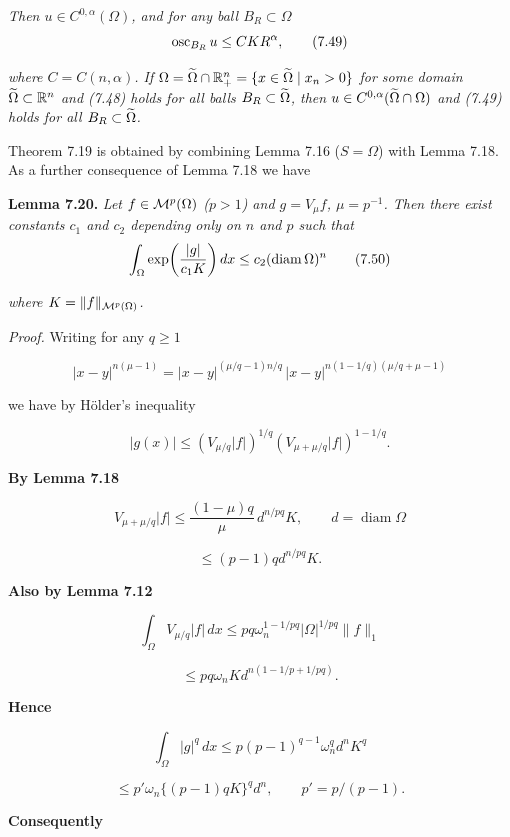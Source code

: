 \emph{Then $u \in C^{0,\alpha}(\Omega)$, and for any ball $B_R \subset \Omega$}
\begin{equation}
\operatorname{osc}_{B_R} u \le CKR^{\alpha},
\tag{7.49}
\end{equation}

\emph{where $C=C(n,\alpha)$. If $\Omega=\widetilde{\Omega} \cap \mathbb{R}^n_{+}=\{x\in \widetilde{\Omega} \mid x_n>0\}$ for some domain
$\widetilde{\Omega} \subset \mathbb{R}^n$ and (7.48) holds for all balls $B_R \subset \widetilde{\Omega}$, then $u \in C^{0,\alpha}(\widetilde{\Omega}\cap \Omega)$ and (7.49) holds for all
$B_R \subset \widetilde{\Omega}$.}

Theorem 7.19 is obtained by combining Lemma 7.16 ($S=\Omega$) with Lemma 7.18.
As a further consequence of Lemma 7.18 we have

\textbf{Lemma 7.20.} \emph{Let $f \in \mathcal{M}^p(\Omega)$ ($p>1$) and $g=V_{\mu}f$, $\mu=p^{-1}$. Then there exist constants $c_1$ and $c_2$ depending only on $n$ and $p$ such that}
\begin{equation}
\int_{\Omega} \exp\!\left(\frac{|g|}{c_1 K}\right) dx \le c_2 (\operatorname{diam} \Omega)^n
\tag{7.50}
\end{equation}

\emph{where $K=\|f\|_{\mathcal{M}^p(\Omega)}$.}


\emph{Proof.} Writing for any $q \geq 1$

\[
|x-y|^{n(\mu-1)} = |x-y|^{(\mu/q-1)n/q}\,|x-y|^{n(1-1/q)(\mu/q+\mu-1)}
\]

we have by H\"older's inequality

\[
|g(x)| \leq (V_{\mu/q}|f|)^{1/q}(V_{\mu+\mu/q}|f|)^{1-1/q}.
\]

\textbf{By Lemma 7.18}

\[
V_{\mu+\mu/q}|f| \leq \frac{(1-\mu)q}{\mu}\,d^{n/pq}K,\qquad d=\operatorname{diam}\Omega
\]

\[
\leq (p-1)q d^{n/pq}K.
\]

\textbf{Also by Lemma 7.12}

\[
\int_{\Omega} V_{\mu/q}|f|\,dx \leq pq\omega_n^{1-1/pq}|\Omega|^{1/pq}\|f\|_1
\]

\[
\leq pq\omega_n Kd^{n(1-1/p+1/pq)}.
\]

\textbf{Hence}

\[
\int_{\Omega} |g|^q\,dx \leq p(p-1)^{q-1}\omega_n^q d^n K^q
\]

\[
\leq p'\omega_n\{(p-1)qK\}^q d^n,\qquad p' = p/(p-1).
\]

\textbf{Consequently}

